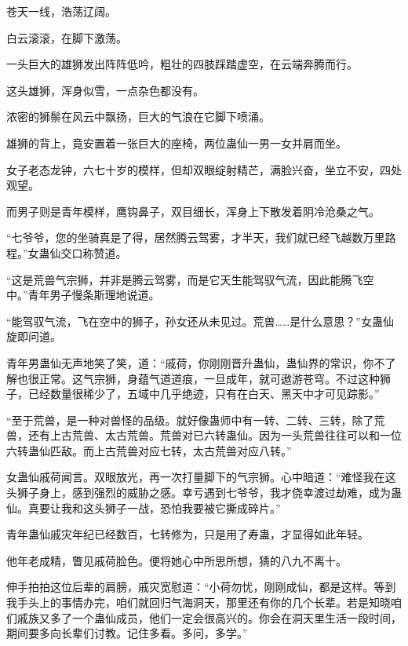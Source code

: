 
\begin{this_body}

苍天一线，浩荡辽阔。

白云滚滚，在脚下激荡。

一头巨大的雄狮发出阵阵低吟，粗壮的四肢踩踏虚空，在云端奔腾而行。

这头雄狮，浑身似雪，一点杂色都没有。

浓密的狮鬃在风云中飘扬，巨大的气浪在它脚下喷涌。

雄狮的背上，竟安置着一张巨大的座椅，两位蛊仙一男一女并肩而坐。

女子老态龙钟，六七十岁的模样，但却双眼绽射精芒，满脸兴奋，坐立不安，四处观望。

而男子则是青年模样，鹰钩鼻子，双目细长，浑身上下散发着阴冷沧桑之气。

“七爷爷，您的坐骑真是了得，居然腾云驾雾，才半天，我们就已经飞越数万里路程。”女蛊仙交口称赞道。

“这是荒兽气宗狮，并非是腾云驾雾，而是它天生能驾驭气流，因此能腾飞空中。”青年男子慢条斯理地说道。

“能驾驭气流，飞在空中的狮子，孙女还从未见过。荒兽……是什么意思？”女蛊仙旋即问道。

青年男蛊仙无声地笑了笑，道：“戚荷，你刚刚晋升蛊仙，蛊仙界的常识，你不了解也很正常。这气宗狮，身蕴气道道痕，一旦成年，就可遨游苍穹。不过这种狮子，已经数量很稀少了，五域中几乎绝迹，只有在白天、黑天中才可见踪影。”

“至于荒兽，是一种对兽怪的品级。就好像蛊师中有一转、二转、三转，除了荒兽，还有上古荒兽、太古荒兽。荒兽对已六转蛊仙。因为一头荒兽往往可以和一位六转蛊仙匹敌。而上古荒兽对应七转，太古荒兽对应八转。”

女蛊仙戚荷闻言。双眼放光，再一次打量脚下的气宗狮。心中暗道：“难怪我在这头狮子身上，感到强烈的威胁之感。幸亏遇到七爷爷，我才侥幸渡过劫难，成为蛊仙。真要让我和这头狮子一战，恐怕我要被它撕成碎片。”

青年蛊仙戚灾年纪已经数百，七转修为，只是用了寿蛊，才显得如此年轻。

他年老成精，瞥见戚荷脸色。便将她心中所思所想，猜的八九不离十。

伸手拍拍这位后辈的肩膀，戚灾宽慰道：“小荷勿忧，刚刚成仙，都是这样。等到我手头上的事情办完，咱们就回归气海洞天，那里还有你的几个长辈。若是知晓咱们戚族又多了一个蛊仙成员，他们一定会很高兴的。你会在洞天里生活一段时间，期间要多向长辈们讨教。记住多看。多问，多学。”


\end{this_body}
